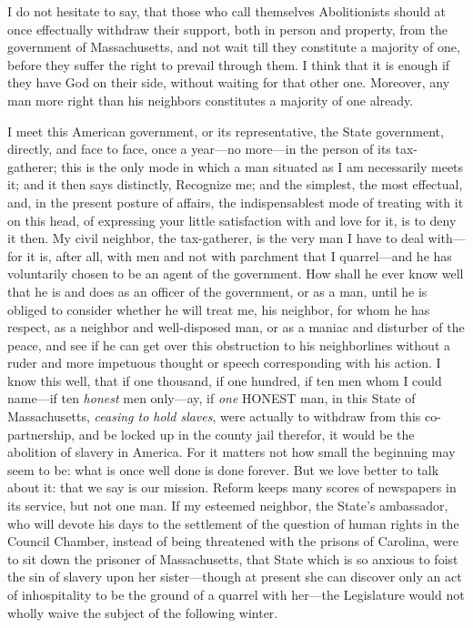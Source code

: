 \documentclass[12pt]{article}
\begin{document}
I do not hesitate to say, that those who call themselves Abolitionists
should at once effectually withdraw their support, both in person and
property, from the government of Massachusetts, and not wait till they
constitute a majority of one, before they suffer the right to prevail
through them. I think that it is enough if they have God on their side,
without waiting for that other one. Moreover, any man more right than
his neighbors constitutes a majority of one already.

I meet this American government, or its representative, the State
government, directly, and face to face, once a year---no more---in the
person of its tax-gatherer; this is the only mode in which a man
situated as I am necessarily meets it; and it then says distinctly,
Recognize me; and the simplest, the most effectual, and, in the present
posture of affairs, the indispensablest mode of treating with it on this
head, of expressing your little satisfaction with and love for it, is to
deny it then. My civil neighbor, the tax-gatherer, is the very man I
have to deal with---for it is, after all, with men and not with
parchment that I quarrel---and he has voluntarily chosen to be an agent
of the government. How shall he ever know well that he is and does as an
officer of the government, or as a man, until he is obliged to consider
whether he will treat me, his neighbor, for whom he has respect, as a
neighbor and well-disposed man, or as a maniac and disturber of the
peace, and see if he can get over this obstruction to his neighborlines
without a ruder and more impetuous thought or speech corresponding with
his action. I know this well, that if one thousand, if one hundred, if
ten men whom I could name---if ten \emph{honest} men only---ay, if
\emph{one} HONEST man, in this State of Massachusetts, \emph{ceasing to
hold slaves}, were actually to withdraw from this co-partnership, and be
locked up in the county jail therefor, it would be the abolition of
slavery in America. For it matters not how small the beginning may seem
to be: what is once well done is done forever. But we love better to
talk about it: that we say is our mission. Reform keeps many scores of
newspapers in its service, but not one man. If my esteemed neighbor, the
State's ambassador, who will devote his days to the settlement of the
question of human rights in the Council Chamber, instead of being
threatened with the prisons of Carolina, were to sit down the prisoner
of Massachusetts, that State which is so anxious to foist the sin of
slavery upon her sister---though at present she can discover only an act
of inhospitality to be the ground of a quarrel with her---the
Legislature would not wholly waive the subject of the following winter.
\end{document}
